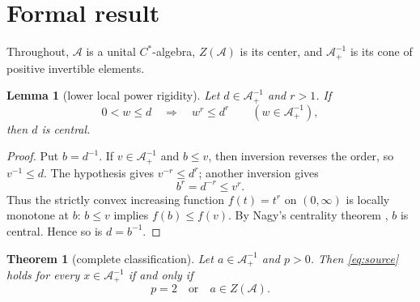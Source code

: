 \documentclass[11pt]{article}
\newtheorem{theorem}{Theorem}
\newtheorem{lemma}{Lemma}
\newcommand{\A}{\mathcal A}
\newcommand{\Z}{Z(\A)}
\newcommand{\posinv}{\A_{+}^{-1}}
\begin{document}
\section{Formal result}

Throughout, $\A$ is a unital $C^*$-algebra, $\Z$ is its center, and
$\posinv$ is its cone of positive invertible elements.

\begin{lemma}[lower local power rigidity]\label{lem:rigidity}
Let $d\in\posinv$ and $r>1$. If
\[
 0<w\le d \quad\Longrightarrow\quad w^r\le d^r
 \qquad(w\in\posinv),
\]
then $d$ is central.
\end{lemma}

\begin{proof}
Put $b=d^{-1}$. If $v\in\posinv$ and $b\le v$, then inversion reverses the
order, so $v^{-1}\le d$. The hypothesis gives
$v^{-r}\le d^r$; another inversion gives
\[
 b^r=d^{-r}\le v^r.
\]
Thus the strictly convex increasing function $f(t)=t^r$ on $(0,\infty)$ is
locally monotone at $b$: $b\le v$ implies $f(b)\le f(v)$. By Nagy's
centrality theorem \cite[Theorem~1]{Nagy}, $b$ is central. Hence so is
$d=b^{-1}$.
\end{proof}

\begin{theorem}[complete classification]\label{thm:main}
Let $a\in\posinv$ and $p>0$. Then \eqref{eq:source} holds for every
$x\in\posinv$ if and only if
\[
 \boxed{\quad p=2\quad\text{or}\quad a\in\Z.\quad}
\]
\end{theorem}
\end{document}
